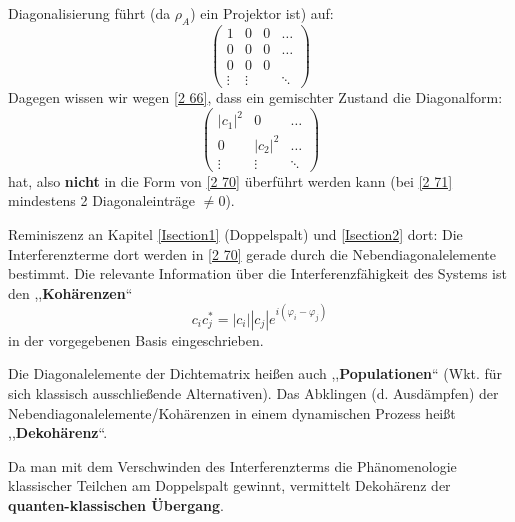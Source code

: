 Diagonalisierung führt (da $ \rho_{A} $) ein Projektor ist) auf:
\begin{equation*}
\begin{pmatrix}
1 & 0 & 0 & \dots \\
0 & 0 & 0 & \dots \\
0 & 0 & 0 \\
\vdots & \vdots & & \ddots
\end{pmatrix}
\end{equation*}
Dagegen wissen wir wegen \eqref{2 66}, dass ein gemischter Zustand die Diagonalform:
\begin{equation}
\begin{pmatrix}
|c_1|^2 & 0  & \dots \\
0 & |c_2|^2  & \dots \\
\vdots & \vdots & \ddots
\end{pmatrix}
\label{2 71}
\end{equation}
hat, also \textbf{nicht} in die Form von \eqref{2 70} überführt werden kann (bei \eqref{2 71} mindestens 2 Diagonaleinträge $ \neq 0 $).\par
Reminiszenz an Kapitel \ref{Isection1} (Doppelspalt) und \ref{Isection2} dort: Die Interferenzterme dort werden in \eqref{2 70} gerade durch die Nebendiagonalelemente bestimmt. Die relevante Information über die Interferenzfähigkeit des Systems ist den ,,\textbf{Kohärenzen}``
\begin{equation*}
c_ic_j^* = |c_i| |c_j| e^{i(\varphi_i - \varphi_j)}
\end{equation*}
in der vorgegebenen Basis eingeschrieben.


\hft


\noindent
Die Diagonalelemente der Dichtematrix heißen auch ,,\textbf{Populationen}`` (Wkt. für sich klassisch ausschließende Alternativen). Das Abklingen (d. Ausdämpfen) der Nebendiagonalelemente/Ko\-härenzen in einem dynamischen Prozess heißt ,,\textbf{Dekohärenz}``.\par
Da man mit dem Verschwinden des Interferenzterms die Phänomenologie klassischer Teilchen am Doppelspalt gewinnt, vermittelt Dekohärenz der \textbf{quanten-klassischen Übergang}.\\[5pt]
